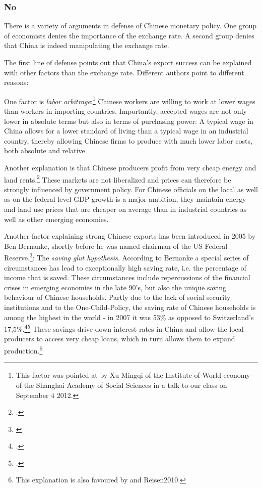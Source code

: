 \subsubsection{No}

There is a variety of arguments in defense of Chinese monetary policy. One group of economists denies the importance of the exchange rate. A second group denies that China is indeed manipulating the exchange rate.

The first line of defense points out that China's export success can be explained with other factors than the exchange rate.  Different authors point to different reasons: 

One factor is \emph{labor arbitrage}:\footnote{This factor was pointed at 
by Xu Mingqi of the Institute of World economy of the Shanghai Academy 
of Social Sciences in a talk to our class on September 4 2012.} Chinese 
workers are willing to work at lower wages than workers in importing 
countries. Importantly, accepted wages are not only lower in absolute 
terms but also in terms of purchasing power: A typical wage in China 
allows for a lower standard of living than a typical wage in an 
industrial country, thereby allowing Chinese firms to produce with much 
lower labor costs, both absolute and relative. 

Another explanation is that Chinese producers profit from very cheap energy and land 
rents.\footnote{\cite[pp.  25]{Huang2010}.} These markets are not 
liberalized and prices can therefore be strongly influenced by 
government policy. For Chinese officials on the local as well as on the 
federal level GDP growth is a major ambition, they maintain energy and 
land use prices that are cheaper on average than in industrial countries 
as well as other emerging economies.

Another factor explaining strong Chinese exports has been introduced 
in 2005 by Ben Bernanke, shortly before he was named chairman of the 
US Federal Reserve.\footnote{\cite{Bernanke2005}}: The \emph{saving 
glut hypothesis}. According to Bernanke a special series of 
circumstances has lead to exceptionally high saving rate, i.e. the 
percentage of income that is saved. These circumstances include 
repercussions of the financial crises in emerging economies in the 
late 90's, but also the unique saving behaviour of Chinese households. 
Partly due to the lack of social security institutions and to the 
One-Child-Policy, the saving rate of Chinese households is among the 
highest in the world - in 2007 it was 53\% as opposed to Switzerland's 
17,5\%.\footnote{\cite[pp. 20]{Yang2011}.}\footnote{\cite{BFS2012}
 .} These savings drive down interest rates in China and allow the local 
producers to access very cheap loans, which in turn allows them to 
expand production.\footnote{This explanation is also favoured by 
\cite[pp. 41]{Wyplosz2010} and \cite{p. 65}{Reisen2010}.}

